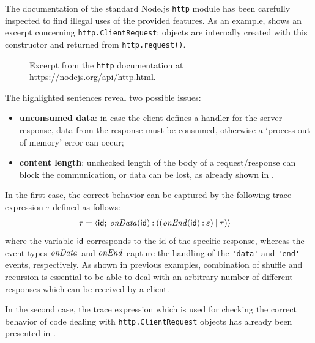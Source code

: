 The documentation of the standard Node.js \lstinline{http} module has been carefully inspected to find illegal uses
of the provided features.
As an example,  shows an excerpt concerning \lstinline{http.ClientRequest};
objects are internally created with this constructor and returned from \lstinline{http.request()}.
\begin{figure}
	\caption{Excerpt from the \lstinline{http} documentation at \url{https://nodejs.org/api/http.html}.}
	\label{fig:httpDoc}
\end{figure}
The highlighted sentences reveal two possible issues:
\begin{itemize}
\item \textbf{unconsumed data}: in case the client defines a handler for the server response, data from the response must be consumed,
  otherwise a `process out of memory' error can occur;
\item \textbf{content length}: unchecked length of the body of a request/response can block the communication, or data can be lost, as already shown
  in .
\end{itemize}
In the first case, the correct behavior can be captured by the following trace expression $\tau$ defined as follows:
\begin{align*}
\tau &= {\langle}\mathsf{id};\:{\mathit{onData}(\mathsf{id}) \mathbin{:} ((\mathit{onEnd}(\mathsf{id}) \mathbin{:} \varepsilon) \mathbin{|} \tau)}{\rangle}
\end{align*}
where the variable $\mathsf{id}$ corresponds to the id of the specific response, whereas the event types
$\mathit{onData}$ and $\mathit{onEnd}$ capture the handling of the \lstinline{'data'} and \lstinline{'end'} events, respectively.
As shown in previous examples, combination of shuffle and recursion is essential to be able to deal with
an arbitrary number of different responses which can be received by a client.

In the second case, the trace expression which is used for checking the correct behavior of code dealing with
\lstinline{http.ClientRequest} objects has already been presented in .

